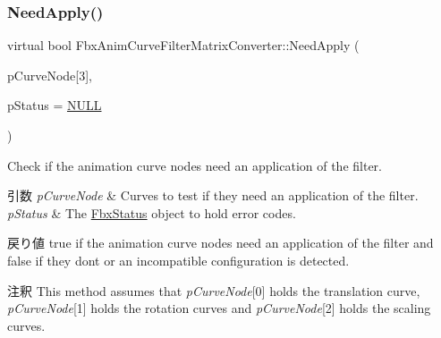 \subsubsection{\texorpdfstring{Need\+Apply()}{NeedApply()}\hspace{0.1cm}{\footnotesize\ttfamily [5/6]}}
{\footnotesize\ttfamily virtual bool Fbx\+Anim\+Curve\+Filter\+Matrix\+Converter\+::\+Need\+Apply (\begin{DoxyParamCaption}\item[{\hyperlink{class_fbx_anim_curve_node}{Fbx\+Anim\+Curve\+Node} $\ast$}]{p\+Curve\+Node\mbox{[}3\mbox{]},  }\item[{\hyperlink{class_fbx_status}{Fbx\+Status} $\ast$}]{p\+Status = {\ttfamily \hyperlink{fbxarch_8h_a070d2ce7b6bb7e5c05602aa8c308d0c4}{N\+U\+LL}} }\end{DoxyParamCaption})\hspace{0.3cm}{\ttfamily [virtual]}}

Check if the animation curve nodes need an application of the filter. 
\begin{DoxyParams}{引数}
{\em p\+Curve\+Node} & Curves to test if they need an application of the filter. \\
\hline
{\em p\+Status} & The \hyperlink{class_fbx_status}{Fbx\+Status} object to hold error codes. \\
\hline
\end{DoxyParams}
\begin{DoxyReturn}{戻り値}
{\ttfamily true} if the animation curve nodes need an application of the filter and {\ttfamily false} if they don\textquotesingle{}t or an incompatible configuration is detected. 
\end{DoxyReturn}
\begin{DoxyRemark}{注釈}
This method assumes that {\itshape p\+Curve\+Node}\mbox{[}0\mbox{]} holds the translation curve, {\itshape p\+Curve\+Node}\mbox{[}1\mbox{]} holds the rotation curves and {\itshape p\+Curve\+Node}\mbox{[}2\mbox{]} holds the scaling curves. 
\end{DoxyRemark}
\mbox{\label{class_fbx_anim_curve_filter_matrix_converter_aa7105a07dbaf0d9598fa930ff2b3141d}} 
